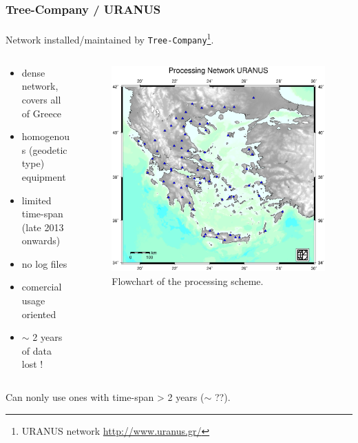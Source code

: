 \documentclass{beamer}
\begin{document}
\begin{frame}\frametitle{Tree-Company / URANUS}\framesubtitle{}
  Network installed/maintained by \texttt{Tree-Company}\footnote{URANUS network \url{http://www.uranus.gr/}}.
\begin{columns}[T] %
\begin{column}{.48\textwidth}
  \begin{itemize}
    \item<pro@1-> dense network, covers all of Greece
    \item<pro@1-> homogenous (geodetic type) equipment
    \item<con@1-> limited time-span (late 2013 onwards)
    \item<con@1-> no log files
    \item<con@1-> comercial usage oriented
    \item<con@1-> $\sim$ 2 years of data lost !
  \end{itemize}
\end{column}%
\hfill%
\begin{column}{.68\textwidth}
 \begin{figure}
 \begin{center}
 \includegraphics[width=.5\textwidth]{img/uranusnet.eps}
 \caption{Flowchart of the processing scheme.}
 \label{fig:dgrm}
 \end{center}
 \end{figure}
\end{column}%
\end{columns}
  \begin{block}{}
  Can nonly use ones with time-span > 2 years ($\sim$ ??). 
  \end{block}
\end{frame}
\end{document}

